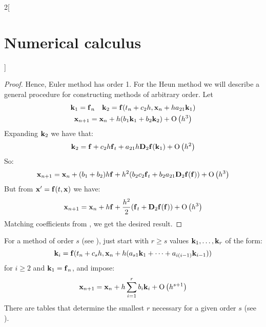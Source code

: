 \documentclass[../../../main_math.tex]{subfiles}
\begin{document}
\begin{multicols}{2}[\section{Numerical calculus}]
\begin{proof}
    Hence, Euler method has order 1. For the Heun method we will describe a general procedure for constructing methods of arbitrary order. Let
    \begin{gather*}
      \vf{k}_1=\vf{f}_n\quad \vf{k}_2=\vf{f}(t_n+c_2h,\vf{x}_n+ha_{21}\vf{k}_1)\\
      \vf{x}_{n+1}=\vf{x}_n+h(b_1\vf{k}_1+b_2\vf{k}_2)+\O{h^3}
    \end{gather*}
    Expanding $\vf{k}_2$ we have that:
    $$\vf{k}_2=\vf{f}+c_2h\vf{{f}}_t+a_{21}h\vf{D}_2\vf{f}(\vf{k}_1)+\O{h^2}$$
    So:
    \begin{equation}\label{NC:heun1}
      \vf{x}_{n+1}=\vf{x}_n+(b_1+b_2)h\vf{f}+h^2(b_2c_2\vf{{f}}_t+b_2a_{21}\vf{D}_2\vf{f}(\vf{f}))+\O{h^3}
    \end{equation}
    But from $\vf{x}'=\vf{f}(t,\vf{x})$ we have:
    \begin{equation}\label{NC:heun2}
      \vf{x}_{n+1}=\vf{x}_n+h\vf{f}+\frac{h^2}{2}(\vf{{f}}_t+\vf{D}_2\vf{f}(\vf{f}))+\O{h^3}
    \end{equation}
    Matching coefficients from , we get the desired result.
  \end{proof}
  \begin{remark}
    For a method of order $s$ (see ), just start with $r\geq s$ values $\vf{k}_1,\ldots,\vf{k}_r$ of the form: $$\vf{k}_i=\vf{f}(t_n+c_sh,\vf{x}_n+h(a_{s1}\vf{k}_1+\cdots+a_{i(i-1)}\vf{k}_{i-1}))$$
    for $i\geq 2$ and $\vf{k}_1=\vf{f}_n$, and impose:
    $$\vf{x}_{n+1}=\vf{x}_n+h\sum_{i=1}^r b_i\vf{k}_i+\O{h^{s+1}}$$
    There are tables that determine the smallest $r$ necessary for a given order $s$ (see ).
  \end{remark}

\end{multicols}
\end{document}
